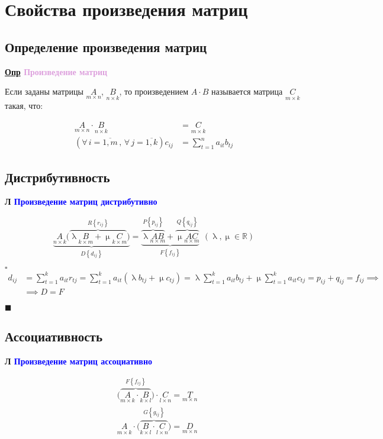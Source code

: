 \documentclass[12pt, a4paper]{report}
\newcommand{\sqbox}{%
	\collectbox{%
		\setlength{\fboxsep}{2pt}%
		\fbox{\BOXCONTENT}%
	}%
}
\newcommand{\df}[1][]{\begin{flushleft}\textbf{\underline{Опр} \textcolor{Plum}{#1}}\end{flushleft}}
\newcommand{\lm}[1][]{\begin{flushleft}\textbf{\sqbox{Л} \textcolor{Blue}{#1}}\end{flushleft}}
\let\oldforall\forall
\renewcommand{\forall}{\oldforall\,}
\begin{document}
	\section{Свойства произведения матриц}
	\subsection{Определение произведения матриц}
	\df[Произведение матриц]
	
	Если заданы матрицы \(\underset{m\times n}{A}\), \(\underset{n\times k}{B}\), то произведением \(A\cdot B\) называется матрица \(\underset{m\times k}{C}\) такая, что:
	
	\begin{align*}
		\underset{m\times n}{A}\cdot\underset{n\times k}{B} &= \underset{m\times k}{C}\\
													\left(\forall i=\overline{1,m}\,,\,\forall j=\overline{1,k}\right)
													c_{ij} &= \sum_{t=1}^{n}a_{it}b_{tj}
	\end{align*}
	\subsection{Дистрибутивность}
	\lm[Произведение матриц дистрибутивно]
	
	\[
		\underbrace{\underset{n\times k}{A}\bigg(\overbrace{\uplambda\underset{k\times m}{B}+\upmu\underset{k\times m}{C}}^{R\left\{r_{ij}\right\}}\bigg)}_{D\left\{d_{ij}\right\}} = \underbrace{\overbrace{\uplambda\underset{n\times m}{AB}}^{P\left\{p_{ij}\right\}}+\overbrace{\upmu\underset{n\times m}{AC}}^{Q\left\{q_{ij}\right\}}}_{F\left\{f_{ij}\right\}}~~\left(\uplambda,\upmu\in\mathbb{R}\right)
	\]
	
	\(\square\)
	\begin{align*}
		d_{ij}&=\sum_{t=1}^{k}a_{it}r_{tj}=\sum_{t=1}^{k}a_{it}\left(\uplambda b_{tj}+\upmu c_{tj}\right)=\uplambda\sum_{t=1}^{k}a_{it}b_{tj}+\upmu\sum_{t=1}^{k}a_{it}c_{tj}=p_{ij}+q_{ij}=f_{ij}\implies\\[5pt]
			&\implies D = F
	\end{align*}
	
	\(\blacksquare\)
	\newpage\subsection{Ассоциативность}
	\lm[Произведение матриц ассоциативно]
	
	\begin{align*}
		&\bigg(\overbrace{\underset{m\times k}{A}\cdot\underset{k\times l}{B}}^{F\left\{f_{ij}\right\}}\bigg)\cdot\underset{l\times n}{C} = \underset{m\times n}{T}\\[5pt]
		&\underset{m\times k}{A}\cdot\bigg(\overbrace{\underset{k\times l}{B}\cdot\underset{l\times n}{C}}^{G\left\{g_{ij}\right\}}\bigg) = \underset{m\times n}{D}
	\end{align*}
	
\end{document}
